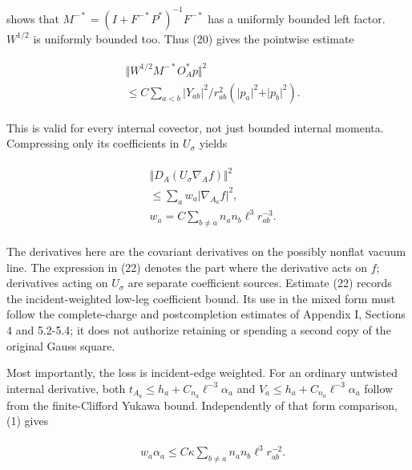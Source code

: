 shows that \(M^{-*}=(I+F^{-*}P^{*})^{-1}F^{-*}\) has a uniformly bounded
left factor. \(W^{1/2}\) is uniformly bounded too. Thus (20) gives the
pointwise estimate

\begin{gather*}
\begin{aligned}
& \Vert W^{1/2}M^{-*}O_{A}^{*}p\Vert ^{2} \\
& \le C \sum _{a<b} \vert Y_{ab}\vert ^{2}/r_{ab}^{2} (\vert p_{a}\vert ^{2}+\vert p_{b}\vert ^{2}).
\end{aligned}\tag{21}
\end{gather*}

This is valid for every internal covector, not just bounded internal
momenta. Compressing only its coefficients in \(U_{\sigma}\) yields

\begin{gather*}
\begin{aligned}
& \Vert D_{A}(U_{\sigma} \nabla _{A} f)\Vert ^{2} \\
& \le \sum _{a} w_{a} \vert \nabla _{A_{a}} f\vert ^{2}, \\
& w_{a}=C \sum _{b\ne a} n_{a} n_{b} \ell ^{3} r_{ab}^{-3}.
\end{aligned}\tag{22}
\end{gather*}

The derivatives here are the covariant derivatives on the possibly
nonflat vacuum line. The expression in (22) denotes the part where the
derivative acts on \(f\); derivatives acting on \(U_{\sigma}\) are
separate coefficient sources. Estimate (22) records the
incident-weighted low-leg coefficient bound. Its use in the mixed form
must follow the complete-charge and postcompletion estimates of Appendix
I, Sections \(4\) and 5.2-5.4; it does not authorize retaining or
spending a second copy of the original Gauss square.

Most importantly, the loss is incident-edge weighted. For an ordinary
untwisted internal derivative, both
\(t_{A_{a}}\le h_{a}+C_{n_{a}} \ell ^{-3} \alpha _{a}\) and
\(V_{a}\le h_{a}+C_{n_{a}} \ell ^{-3} \alpha _{a}\) follow from the
finite-Clifford Yukawa bound. Independently of that form comparison, (1)
gives

\begin{gather*}
\begin{aligned}
& w_{a} \alpha _{a} \le C \kappa  \sum _{b\ne a}n_{a} n_{b} \ell ^{3} r_{ab}^{-2}.
\end{aligned}\tag{23}
\end{gather*}

